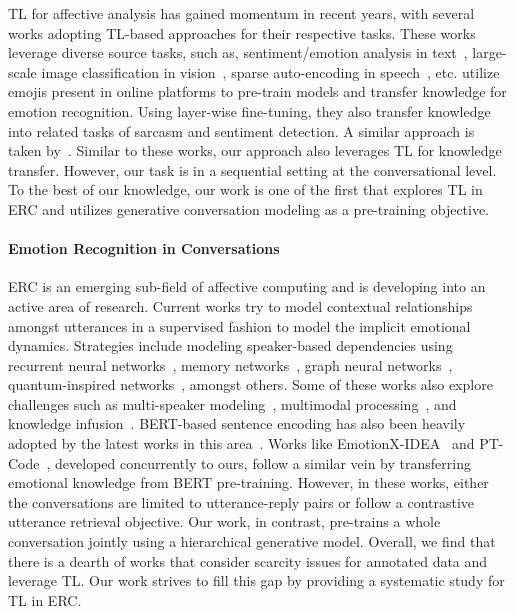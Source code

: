 \documentclass[preprint,3pt]{elsarticle}
\begin{document}
TL for affective analysis has gained momentum in recent years, with several works adopting TL-based approaches for their respective tasks. These works leverage diverse source tasks, such as, sentiment/emotion analysis in text~\cite{yu2018improving,DBLP:conf/semeval/Daval-FrerotBM18,bouchekif2019epita}, large-scale image classification in vision~\cite{ng2015deep}, sparse auto-encoding in speech~\cite{deng2013sparse}, etc. \citeauthor{DBLP:conf/emnlp/FelboMSRL17} utilize emojis present in online platforms to pre-train models and transfer knowledge for emotion recognition. Using layer-wise fine-tuning, they also transfer knowledge into related tasks of sarcasm and sentiment detection. A similar approach is taken by~\citeauthor{DBLP:conf/semeval/Daval-FrerotBM18}. Similar to these works, our approach also leverages TL for knowledge transfer. However, our task is in a sequential setting at the conversational level. To the best of our knowledge, our work is one of the first that explores TL in ERC and utilizes generative conversation modeling as a pre-training objective.
    
\paragraph{Emotion Recognition in Conversations} 

ERC is an emerging sub-field of affective computing and is developing into an active area of research. Current works try to model contextual relationships amongst utterances in a supervised fashion to model the implicit emotional dynamics. Strategies include modeling speaker-based dependencies using recurrent neural networks~\cite{DBLP:conf/semeval/Gonzalez-Garduno19,DBLP:conf/naacl/JiaoYKL19}, memory networks~\cite{DBLP:conf/naacl/HazarikaPZCMZ18,hazarika2018icon}, graph neural networks~\cite{DBLP:journals/corr/abs-1908-11540,DBLP:conf/ijcai/ZhangWSLZZ19}, quantum-inspired networks~\cite{DBLP:conf/ijcai/ZhangL0ZW19}, amongst others. Some of these works also explore challenges such as multi-speaker modeling~\cite{DBLP:conf/aaai/MajumderPHMGC19}, multimodal processing~\cite{hazarika2018icon}, and knowledge infusion~\cite{DBLP:journals/corr/abs-1909-10681}. BERT-based sentence encoding has also been heavily adopted by the latest works in this area~\cite{DBLP:conf/semeval/ChatterjeeNJA19}. Works like EmotionX-IDEA~\cite{DBLP:journals/corr/abs-1908-06264} and PT-Code~\cite{DBLP:journals/corr/abs-1910-08916}, developed concurrently to ours, follow a similar vein by transferring emotional knowledge from BERT pre-training. However, in these works, either the conversations are limited to utterance-reply pairs or follow a contrastive utterance retrieval objective. Our work, in contrast, pre-trains a whole conversation jointly using a hierarchical generative model. Overall, we find that there is a dearth of works that consider scarcity issues for annotated data and leverage TL. Our work strives to fill this gap by providing a systematic study for TL in ERC.
\end{document}
